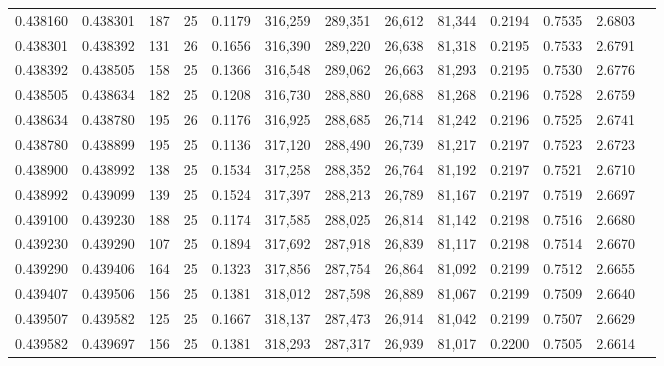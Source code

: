 \begin{tabular}{rrrrrrrrrrrrr}
0.438160 & 0.438301 &   187 &  25 &                                     0.1179 & 316,259 & 289,351 &  26,612 &  81,344 & 0.2194 & 0.7535 & 2.6803 \\
0.438301 & 0.438392 &   131 &  26 &                                     0.1656 & 316,390 & 289,220 &  26,638 &  81,318 & 0.2195 & 0.7533 & 2.6791 \\
0.438392 & 0.438505 &   158 &  25 &                                     0.1366 & 316,548 & 289,062 &  26,663 &  81,293 & 0.2195 & 0.7530 & 2.6776 \\
0.438505 & 0.438634 &   182 &  25 &                                     0.1208 & 316,730 & 288,880 &  26,688 &  81,268 & 0.2196 & 0.7528 & 2.6759 \\
0.438634 & 0.438780 &   195 &  26 &                                     0.1176 & 316,925 & 288,685 &  26,714 &  81,242 & 0.2196 & 0.7525 & 2.6741 \\
0.438780 & 0.438899 &   195 &  25 &                                     0.1136 & 317,120 & 288,490 &  26,739 &  81,217 & 0.2197 & 0.7523 & 2.6723 \\
0.438900 & 0.438992 &   138 &  25 &                                     0.1534 & 317,258 & 288,352 &  26,764 &  81,192 & 0.2197 & 0.7521 & 2.6710 \\
0.438992 & 0.439099 &   139 &  25 &                                     0.1524 & 317,397 & 288,213 &  26,789 &  81,167 & 0.2197 & 0.7519 & 2.6697 \\
0.439100 & 0.439230 &   188 &  25 &                                     0.1174 & 317,585 & 288,025 &  26,814 &  81,142 & 0.2198 & 0.7516 & 2.6680 \\
0.439230 & 0.439290 &   107 &  25 &                                     0.1894 & 317,692 & 287,918 &  26,839 &  81,117 & 0.2198 & 0.7514 & 2.6670 \\
0.439290 & 0.439406 &   164 &  25 &                                     0.1323 & 317,856 & 287,754 &  26,864 &  81,092 & 0.2199 & 0.7512 & 2.6655 \\
0.439407 & 0.439506 &   156 &  25 &                                     0.1381 & 318,012 & 287,598 &  26,889 &  81,067 & 0.2199 & 0.7509 & 2.6640 \\
0.439507 & 0.439582 &   125 &  25 &                                     0.1667 & 318,137 & 287,473 &  26,914 &  81,042 & 0.2199 & 0.7507 & 2.6629 \\
0.439582 & 0.439697 &   156 &  25 &                                     0.1381 & 318,293 & 287,317 &  26,939 &  81,017 & 0.2200 & 0.7505 & 2.6614 \\

\end{tabular}
